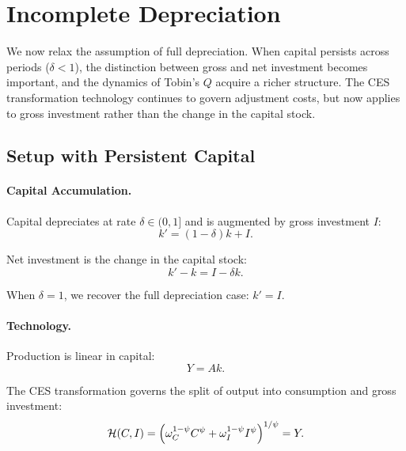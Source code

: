 \section{Incomplete Depreciation}
\label{sec:ac-depreciation}

We now relax the assumption of full depreciation. When capital persists across periods ($\delta < 1$), the distinction between gross and net investment becomes important, and the dynamics of Tobin's $Q$ acquire a richer structure. The CES transformation technology continues to govern adjustment costs, but now applies to gross investment rather than the change in the capital stock.

\subsection{Setup with Persistent Capital}
\label{subsec:ac-dep-setup}

\paragraph{Capital Accumulation.}
Capital depreciates at rate $\delta \in (0, 1]$ and is augmented by gross investment $I$:
\begin{equation}
k' = (1 - \delta) k + I.
\label{eq:ac-dep-accum}
\end{equation}

Net investment is the change in the capital stock:
\begin{equation}
k' - k = I - \delta k.
\label{eq:ac-dep-net}
\end{equation}

When $\delta = 1$, we recover the full depreciation case: $k' = I$.

\paragraph{Technology.}
Production is linear in capital:
\begin{equation}
Y = A k.
\label{eq:ac-dep-production}
\end{equation}

The CES transformation governs the split of output into consumption and gross investment:
\begin{equation}
\mathcal{H}(C, I) = \left( \omega_C^{1-\psi} C^{\psi} + \omega_I^{1-\psi} I^{\psi} \right)^{1/\psi} = Y.
\label{eq:ac-dep-transformation}
\end{equation}

